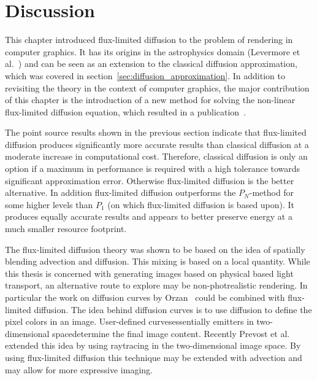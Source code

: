 \section{Discussion}
\label{sec:fld_discussion}

This chapter introduced flux-limited diffusion to the problem of rendering in computer graphics. It has its origins in the astrophysics domain (Levermore et al.~\cite{Levermore81}) and can be seen as an extension to the classical diffusion approximation, which was covered in section~\ref{sec:diffusion_approximation}. In addition to revisiting the theory in the context of computer graphics, the major contribution of this chapter is the introduction of a new method for solving the non-linear flux-limited diffusion equation, which resulted in a publication~\cite{Koerner14}.

The point source results shown in the previous section indicate that flux-limited diffusion produces significantly more accurate results than classical diffusion at a moderate increase in computational cost. Therefore, classical diffusion is only an option if a maximum in performance is required with a high tolerance towards significant approximation error. Otherwise flux-limited diffusion is the better alternative. In addition flux-limited diffusion outperforms the $P_N$-method for some higher levels than $P_1$ (on which flux-limited diffusion is based upon). It produces equally accurate results and appears to better preserve energy at a much smaller resource footprint.

The flux-limited diffusion theory was shown to be based on the idea of spatially blending advection and diffusion. This mixing is based on a local quantity. While this thesis is concerned with generating images based on physical based light transport, an alternative route to explore may be non-photrealistic rendering. In particular the work on diffusion curves by Orzan~\cite{Orzan08} could be combined with flux-limited diffusion. The idea behind diffusion curves is to use diffusion to define the pixel colors in an image. User-defined curves\mydash essentially emitters in two-dimensional space\mydash determine the final image content. Recently Prevost et al.~\cite{Prevost15} extended this idea by using raytracing in the two-dimensional image space. By using flux-limited diffusion this technique may be extended with advection and may allow for more expressive imaging.

